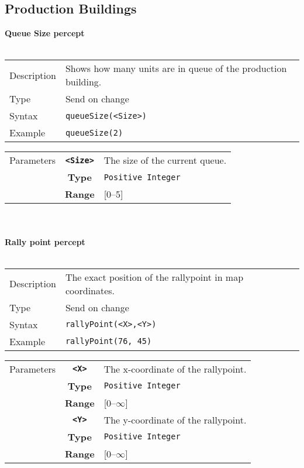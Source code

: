 \subsection{Production Buildings}
\textbf{Queue Size percept}\\
\\
\begin{tabularx}{\textwidth}{lX}
 Description & Shows how many units are in queue of the production building.\\
 Type & Send on change \\
 Syntax & \verb|queueSize(<Size>)| \\
 Example & \verb|queueSize(2)| \\ 
 \end{tabularx}
 \begin{tabularx}{\textwidth}{l | c | p{8cm}|}
 \cline{2-3} 
 Parameters & \textbf{\verb|<Size>|} & The size of the current queue. \\
            & \textbf{Type} & \verb|Positive Integer| \\
            & \textbf{Range} & [0--5] \\
            \cline{2-3} 
\end{tabularx}\\
\\
\newpage
\noindent
\textbf{Rally point percept}\\
\\
\begin{tabularx}{\textwidth}{lX}
 Description & The exact position of the rallypoint in map coordinates. \\
 Type & Send on change \\
 Syntax & \verb|rallyPoint(<X>,<Y>)| \\
 Example & \verb|rallyPoint(76, 45)| \\ 
 \end{tabularx}
 \begin{tabularx}{\textwidth}{l | c | p{8cm}|}
 \cline{2-3} 
 Parameters & \textbf{\verb|<X>|} & The x-coordinate of the rallypoint.\\
            & \textbf{Type} & \verb|Positive Integer| \\
            & \textbf{Range} & [0--$\infty$] \\
            \cline{2-3} 
            & \textbf{\verb|<Y>|} & The y-coordinate of the rallypoint.\\
            & \textbf{Type} & \verb|Positive Integer| \\
            & \textbf{Range} & [0--$\infty$] \\
            \cline{2-3} 
\end{tabularx}\\
\\

